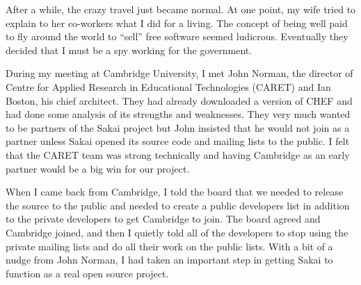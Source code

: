\documentclass[12pt]{book}
\begin{document}
After a while, the crazy travel just became normal.  At one
point, my wife tried to explain to her co-workers what I
did for a living.  The concept of being well paid to fly around
the world to ``sell'' free software seemed ludicrous.
Eventually they decided that I must be a spy working
for the government.


During my meeting at Cambridge University, I met John Norman,
the director of Centre for Applied Research in Educational Technologies (CARET)
and Ian Boston, his chief architect.  They had already downloaded
a version of CHEF and had done some analysis of its strengths and weaknesses.  They very
much wanted to be partners of the Sakai project but John insisted that he would
not join as a partner unless Sakai opened its source code and mailing lists
to the public. I felt that the CARET team was strong technically and having
Cambridge as an early partner would be a big win for our project.


When I came back from Cambridge, I told the board that we needed to
release the source to the public and needed to create a public developers
list in addition to the private developers to get Cambridge to join.
The board agreed and Cambridge joined, and then I quietly told all of the
developers to stop using the private mailing lists and do all their work
on the public lists.  With a bit of a nudge from John Norman,
I had taken an important step in getting Sakai to function as a
real open source project.
\end{document}

